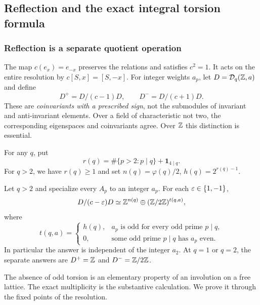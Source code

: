 \subsection{Reflection and the exact integral torsion formula}
\label{ir:sec:reflection}

\subsubsection{Reflection is a separate quotient operation}
The map $c(e_x)=e_{-x}$ preserves the relations and satisfies $c^2=1$.
It acts on the entire resolution by $c[S,x]=[S,-x]$.
For integer weights $a_p$, let $D=\mathcal D_q(\mathbb{Z},a)$ and define
\[
 D^+=D/(c-1)D,\qquad D^-=D/(c+1)D.
\]
These are \emph{coinvariants with a prescribed sign}, not the submodules
of invariant and anti-invariant elements. Over a field of characteristic
not two, the corresponding eigenspaces and coinvariants agree. Over
$\mathbb{Z}$ this distinction is essential.

For any $q$, put
\begin{equation}\label{ir:eq:r-h}
 r(q)=\#\{p>2:p\mid q\}+\mathbf 1_{4\mid q}.
\end{equation}
For $q>2$, we have $r(q)\ge1$ and set
$n(q)=\varphi(q)/2$, $h(q)=2^{r(q)-1}$.

\begin{theorem}
\label{ir:thm:integer-reflection}
Let $q>2$ and specialize every $A_p$ to an integer $a_p$. For each
$\varepsilon\in\{1,-1\}$,
\begin{equation}\label{ir:eq:integer-reflection}
 D/(c-\varepsilon)D\simeq\mathbb{Z}^{n(q)}\oplus(\mathbb{Z}/2\mathbb{Z})^{t(q,a)},
\end{equation}
where
\begin{equation}\label{ir:eq:torsion-count}
 t(q,a)=
 \begin{cases}
  h(q),&a_p\text{ is odd for every odd prime }p\mid q,\\
  0,&\text{some odd prime }p\mid q\text{ has }a_p\text{ even}.
 \end{cases}
\end{equation}
In particular the answer is independent of the integer $a_2$.
At $q=1$ or $q=2$, the separate answers are $D^+=\mathbb{Z}$ and
$D^-=\mathbb{Z}/2\mathbb{Z}$.
\end{theorem}

The absence of odd torsion is an elementary property of an involution
on a free lattice. The exact multiplicity is the substantive calculation.
We prove it through the fixed points of the resolution.

